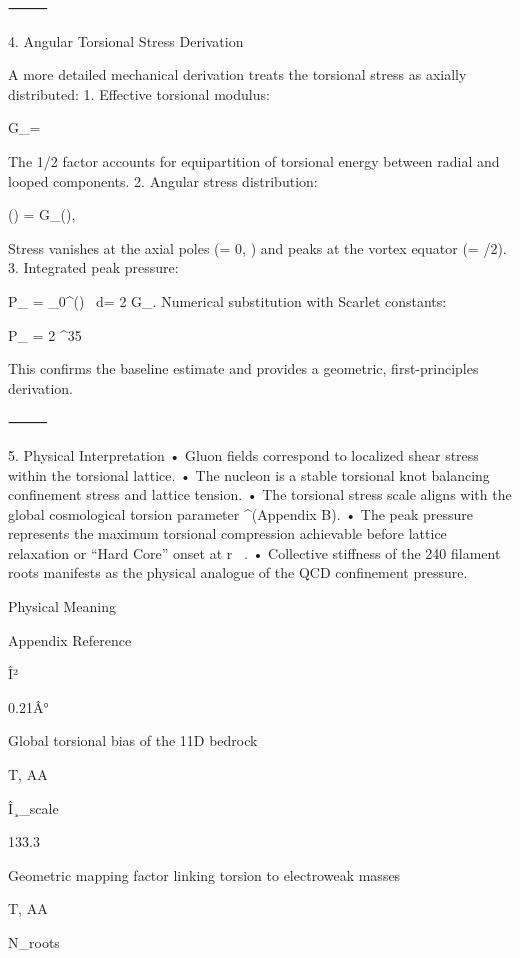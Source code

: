 ⸻

4. Angular Torsional Stress Derivation

A more detailed mechanical derivation treats the torsional stress as axially distributed:
	1.	Effective torsional modulus:

G_\tau =  \cdot {}

The 1/2 factor accounts for equipartition of torsional energy between radial and looped components.
	2.	Angular stress distribution:

\sigma(\theta) = G_\tau \sin(\theta), \quad \theta \in [0, \pi]

Stress vanishes at the axial poles (\theta = 0, \pi) and peaks at the vortex equator (\theta = \pi/2).
	3.	Integrated peak pressure:

P_{} = \int_0^\pi \sigma(\theta) \, d\theta = 2 G_.	Numerical substitution with Scarlet constants:

P_{} = 2 \cdot {} \cdot {} \cdot \pi {} ^{35}\ 

This confirms the baseline estimate and provides a geometric, first-principles derivation.

⸻

5. Physical Interpretation
	•	Gluon fields correspond to localized shear stress within the torsional lattice.
	•	The nucleon is a stable torsional knot balancing confinement stress and lattice tension.
	•	The torsional stress scale aligns with the global cosmological torsion parameter \beta {}^\circ (Appendix B).
	•	The peak pressure represents the maximum torsional compression achievable before lattice relaxation or “Hard Core” onset at r \ .
	•	Collective stiffness of the 240 filament roots manifests as the physical analogue of the QCD confinement pressure.

Physical Meaning

Appendix Reference

Î²

0.21Â°

Global torsional bias of the 11D bedrock

T, AA

Î¸_scale

133.3

Geometric mapping factor linking torsion to electroweak masses

T, AA

N_roots

